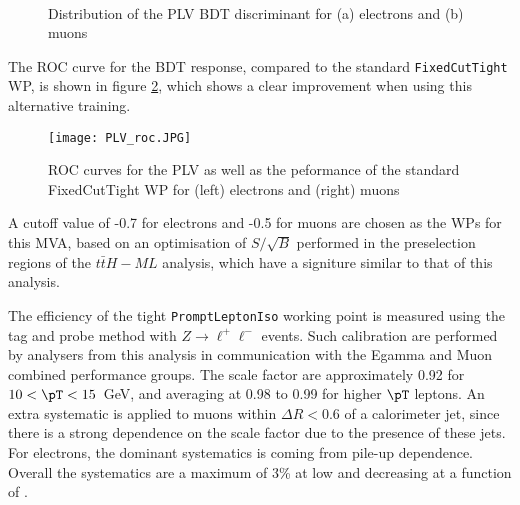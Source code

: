 \begin{figure}[H]
\begin{center}
    \\
    \label{fig:PLV_score}
    \caption{Distribution of the PLV BDT discriminant for (a) electrons and (b) muons}
\end{center}
\end{figure}

The ROC curve for the BDT response, compared to the standard \verb!FixedCutTight! WP, is shown in figure \ref{fig:PLV_roc}, which shows a clear improvement when using this alternative training.

\begin{figure}[H]
\begin{center}
    \texttt{[image: PLV\_roc.JPG]}
    \label{fig:PLV_roc}
    \caption{ROC curves for the PLV as well as the peformance of the standard FixedCutTight WP for (left) electrons and (right) muons}
\end{center}
\end{figure}

A cutoff value of -0.7 for electrons and -0.5 for muons are chosen as the WPs for this MVA, based on an optimisation of $S/\sqrt{B}$ performed in the preselection regions of the $t\bar{t}H-ML$ analysis, which have a signiture similar to that of this analysis.

The efficiency of the tight \texttt{PromptLeptonIso} working point is measured using the tag and probe method with $Z\rightarrow \ell^{+}\ell^{-}$ events. Such calibration are performed by analysers from this analysis in communication with the Egamma and Muon combined performance groups. The scale factor are approximately 0.92 for $10 < \pT < 15$~GeV, and averaging at 0.98 to 0.99 for higher $\pT$ leptons. An extra systematic is applied to muons within $\Delta R < 0.6$ of a calorimeter jet, since there is a strong dependence on the scale factor due to the presence of these jets. For electrons, the dominant systematics  is coming from pile-up dependence. Overall the systematics are a maximum of 3\% at low \pT and decreasing at a function of \pT.

